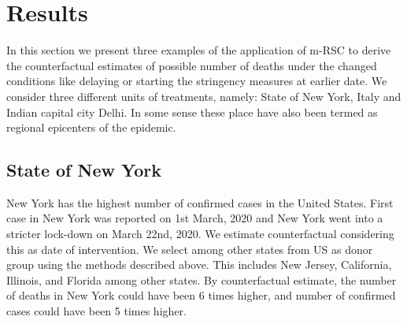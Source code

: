 \documentclass[preprint,authoryear,12pt]{elsarticle}
\begin{document}
\section{Results}
\label{SEC4}
In this section we present three examples of the application of m-RSC to derive the counterfactual estimates of possible number of deaths under the changed conditions like delaying or starting the stringency measures at earlier date. We consider three different units of treatments, namely: State of New York, Italy and Indian capital city Delhi. In some sense these place have also been termed as regional epicenters of the epidemic.

	\subsection{State of New York}
	New York has the highest number of confirmed cases in the United States. First case in New York was reported on 1st March, 2020 and New York went into a stricter lock-down on March 22nd, 2020. We estimate counterfactual considering this as date of intervention. We select among other states from US as donor group using the methods described above. This includes New Jersey, California, Illinois, and Florida among other states. By counterfactual estimate, the number of deaths in New York could have been 6 times higher, and number of confirmed cases could have been 5 times higher.
	
\end{document}
